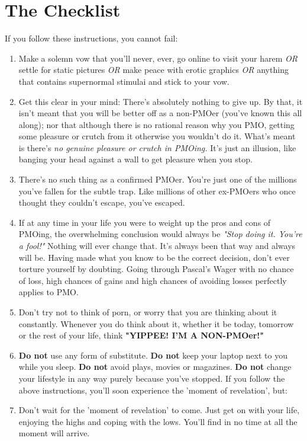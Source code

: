 \documentclass[easypeasy.tex]{subfiles}
\begin{document}
\section{The Checklist}

  If you follow these instructions, you cannot fail:
\begin{enumerate}
  \item Make a solemn vow that you'll never, ever, go online to visit your harem \textit{OR} settle for static pictures \textit{OR} make peace with erotic graphics \textit{OR} anything that contains supernormal stimulai and stick to your vow.

    \item Get this clear in your mind: There's absolutely nothing to give up. By that, it isn't meant that you will be better off as a non-PMOer (you've known this all along); nor that although there is no rational reason why you PMO, getting some pleasure or crutch from it otherwise you wouldn't do it. What's meant is there's \textit{no genuine pleasure or crutch in PMOing.} It's just an illusion, like banging your head against a wall to get pleasure when you stop.

    \item There's no such thing as a confirmed PMOer. You're just one of the millions you've fallen for the subtle trap. Like millions of other ex-PMOers who once thought they couldn't escape, you've escaped.

    \item If at any time in your life you were to weight up the pros and cons of PMOing, the overwhelming conclusion would always be \textit{"Stop doing it. You're a fool!"} Nothing will ever change that. It's always been that way and always will be. Having made what you know to be the correct decision, don't ever torture yourself by doubting. Going through Pascal's Wager with no chance of loss, high chances of gains and high chances of avoiding losses perfectly applies to PMO.

    \item Don't try not to think of porn, or worry that you are thinking about it constantly. Whenever you do think about it, whether it be today, tomorrow or the rest of your life, think \textbf{"YIPPEE! I'M A NON-PMOer!"}

    \item \textbf{Do not} use any form of substitute. \textbf{Do not} keep your laptop next to you while you sleep. \textbf{Do not} avoid plays, movies or magazines. \textbf{Do not} change your lifestyle in any way purely because you've stopped. If you follow the above instructions, you'll soon experience the 'moment of revelation', but:

    \item Don't wait for the 'moment of revelation' to come. Just get on with your life, enjoying the highs and coping with the lows. You'll find in no time at all the moment will arrive.
\end{enumerate}
\end{document}

